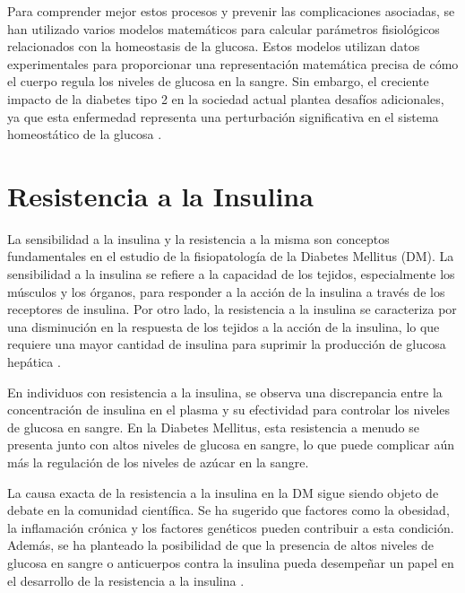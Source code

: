 Para comprender mejor estos procesos y prevenir las complicaciones asociadas, se han utilizado varios modelos matemáticos para calcular parámetros fisiológicos relacionados con la homeostasis de la glucosa. Estos modelos utilizan datos experimentales para proporcionar una representación matemática precisa de cómo el cuerpo regula los niveles de glucosa en la sangre. Sin embargo, el creciente impacto de la diabetes tipo 2 en la sociedad actual plantea desafíos adicionales, ya que esta enfermedad representa una perturbación significativa en el sistema homeostático de la glucosa \cite{ModelacionMatematica2020}.


\section{Resistencia a la Insulina}

La sensibilidad a la insulina y la resistencia a la misma son conceptos fundamentales en el estudio de la fisiopatología de la Diabetes Mellitus (DM). La sensibilidad a la insulina se refiere a la capacidad de los tejidos, especialmente los músculos y los órganos, para responder a la acción de la insulina a través de los receptores de insulina. Por otro lado, la resistencia a la insulina se caracteriza por una disminución en la respuesta de los tejidos a la acción de la insulina, lo que requiere una mayor cantidad de insulina para suprimir la producción de glucosa hepática \cite{MedicionEstimacion}.

En individuos con resistencia a la insulina, se observa una discrepancia entre la concentración de insulina en el plasma y su efectividad para controlar los niveles de glucosa en sangre. En la Diabetes Mellitus, esta resistencia a menudo se presenta junto con altos niveles de glucosa en sangre, lo que puede complicar aún más la regulación de los niveles de azúcar en la sangre.

La causa exacta de la resistencia a la insulina en la DM sigue siendo objeto de debate en la comunidad científica. Se ha sugerido que factores como la obesidad, la inflamación crónica y los factores genéticos pueden contribuir a esta condición. Además, se ha planteado la posibilidad de que la presencia de altos niveles de glucosa en sangre o anticuerpos contra la insulina pueda desempeñar un papel en el desarrollo de la resistencia a la insulina \cite{MedicionEstimacion}.

